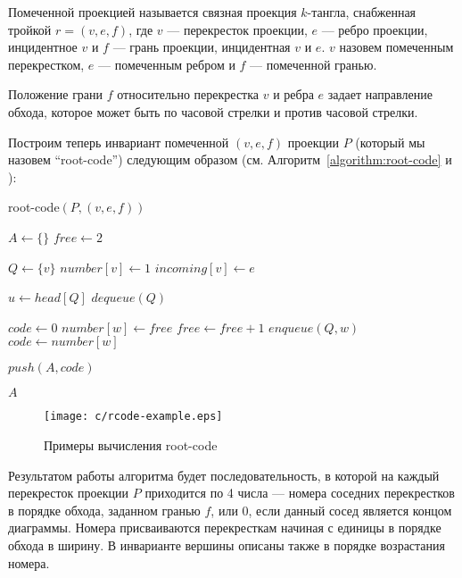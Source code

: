 		\begin{definition}
			Помеченной проекцией называется связная проекция $k$-тангла, снабженная тройкой $r = (v, e, f)$, где $v$ ---
			перекресток проекции, $e$ --- ребро проекции, инцидентное $v$ и $f$ --- грань проекции, инцидентная $v$ и $e$.
			$v$ назовем помеченным перекрестком, $e$ --- помеченным ребром и $f$ --- помеченной гранью.
		\end{definition}

		Положение грани $f$ относительно перекрестка $v$ и ребра $e$ задает направление обхода, которое может быть по часовой
		стрелки и против часовой стрелки.

		Построим теперь инвариант помеченной $(v, e, f)$ проекции $P$ (который мы назовем ``root-code'') следующим образом
		(см. Алгоритм~\ref{algorithm:root-code} и ):

		\begin{algorithm}[H]
			\caption{root-code$(P, (v, e, f))$\label{algorithm:root-code}}
			\begin{algorithmic}[1]
				\STATE $A \leftarrow \{\}$
				\STATE $free \leftarrow 2$

				\STATE $Q \leftarrow \{v\}$
				\STATE $number[v] \leftarrow 1$
				\STATE $incoming[v] \leftarrow e$

					\STATE $u \leftarrow head[Q]$
					\STATE $dequeue(Q)$

							\STATE $code \leftarrow 0$
						\ELSE
								\STATE $number[w] \leftarrow free$
								\STATE $free \leftarrow free + 1$
								\STATE $enqueue(Q, w)$
							\ENDIF
							\STATE $code \leftarrow number[w]$
						\ENDIF

						\STATE $push(A, code)$
					\ENDFOR
				\ENDWHILE

				\RETURN $A$
			\end{algorithmic}
		\end{algorithm}

		\begin{figure}[ht]
			\centering
			\texttt{[image: c/rcode-example.eps]}
			\caption{Примеры вычисления root-code\label{figure:rcode-example}}
		\end{figure}

		Результатом работы алгоритма будет последовательность, в которой на каждый перекресток проекции $P$ приходится по 4 числа ---
		номера соседних перекрестков в порядке обхода, заданном гранью $f$, или $0$, если данный сосед является концом диаграммы.
		Номера присваиваются перекресткам начиная с единицы в порядке обхода в ширину. В инварианте вершины описаны также в порядке
		возрастания номера.

